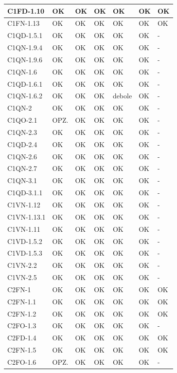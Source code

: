 \begin{footnotesize}
\begin{longtable}{|p{}|p{}|p{}|p{}|p{}|p{}|p{}|}
 C1FD-1.10&  OK&  OK&  OK&  OK&  OK& OK\\ \hline
 C1FN-1.13&  OK&  OK&  OK&  OK&  OK& OK\\ \hline
 C1QD-1.5.1&  OK&  OK&  OK&  OK&  OK& -\\ \hline
 C1QN-1.9.4&  OK&  OK&  OK&  OK&  OK& -\\ \hline
 C1QN-1.9.6&  OK&  OK&  OK&  OK&  OK& -\\ \hline
 C1QN-1.6&  OK&  OK&  OK&  OK&  OK& -\\ \hline
 C1QD-1.6.1&  OK&  OK&  OK&  OK&  OK& -\\ \hline
 C1QN-1.6.2&  OK&  OK&  OK&  debole&  OK& -\\ \hline
 C1QN-2&  OK&  OK&  OK&  OK&  OK& -\\ \hline
 C1QO-2.1&  OPZ.&  OK&  OK&  OK&  OK& -\\ \hline
 C1QN-2.3&  OK&  OK&  OK&  OK&  OK& -\\ \hline
 C1QD-2.4&  OK&  OK&  OK&  OK&  OK& -\\ \hline
 C1QN-2.6&  OK&  OK&  OK&  OK&  OK& -\\ \hline
 C1QN-2.7&  OK&  OK&  OK&  OK&  OK& -\\ \hline
 C1QN-3.1&  OK&  OK&  OK&  OK&  OK& -\\ \hline
 C1QD-3.1.1&  OK&  OK&  OK&  OK&  OK& -\\ \hline
 C1VN-1.12&  OK&  OK&  OK&  OK&  OK& -\\ \hline
 C1VN-1.13.1&  OK&  OK&  OK&  OK&  OK& -\\ \hline
 C1VN-1.11&  OK&  OK&  OK&  OK&  OK& -\\ \hline
 C1VD-1.5.2&  OK&  OK&  OK&  OK&  OK& -\\ \hline
 C1VD-1.5.3&  OK&  OK&  OK&  OK&  OK& -\\ \hline
 C1VN-2.2&  OK&  OK&  OK&  OK&  OK& -\\ \hline
 C1VN-2.5&  OK&  OK&  OK&  OK&  OK& -\\ \hline
 C2FN-1&  OK&  OK&  OK&  OK&  OK& OK\\ \hline
 C2FN-1.1&  OK&  OK&  OK&  OK&  OK& OK\\ \hline
 C2FN-1.2&  OK&  OK&  OK&  OK&  OK& OK\\ \hline
 C2FO-1.3&  OK&  OK&  OK&  OK&  OK& -\\ \hline
 C2FD-1.4&  OK&  OK&  OK&  OK&  OK& OK\\ \hline
 C2FN-1.5&  OK&  OK&  OK&  OK&  OK& OK\\ \hline
 C2FO-1.6&  OPZ.&  OK&  OK&  OK&  OK& -\\ \hline

\end{longtable}
\end{footnotesize}
